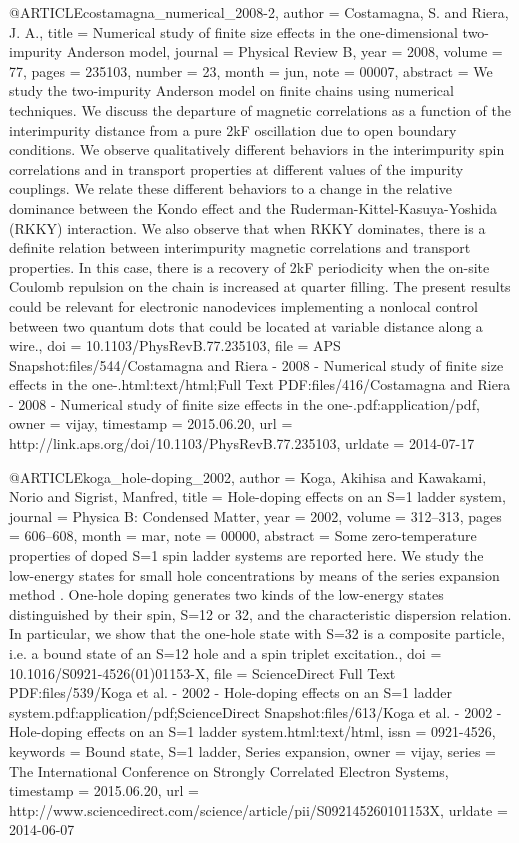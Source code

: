 @ARTICLE{costamagna_numerical_2008-2,
  author = {Costamagna, S. and Riera, J. A.},
  title = {Numerical study of finite size effects in the one-dimensional two-impurity
	{Anderson} model},
  journal = {Physical Review B},
  year = {2008},
  volume = {77},
  pages = {235103},
  number = {23},
  month = jun,
  note = {00007},
  abstract = {We study the two-impurity Anderson model on finite chains using numerical
	techniques. We discuss the departure of magnetic correlations as
	a function of the interimpurity distance from a pure 2kF oscillation
	due to open boundary conditions. We observe qualitatively different
	behaviors in the interimpurity spin correlations and in transport
	properties at different values of the impurity couplings. We relate
	these different behaviors to a change in the relative dominance between
	the Kondo effect and the Ruderman-Kittel-Kasuya-Yoshida (RKKY) interaction.
	We also observe that when RKKY dominates, there is a definite relation
	between interimpurity magnetic correlations and transport properties.
	In this case, there is a recovery of 2kF periodicity when the on-site
	Coulomb repulsion on the chain is increased at quarter filling. The
	present results could be relevant for electronic nanodevices implementing
	a nonlocal control between two quantum dots that could be located
	at variable distance along a wire.},
  doi = {10.1103/PhysRevB.77.235103},
  file = {APS Snapshot:files/544/Costamagna and Riera - 2008 - Numerical study of finite size effects in the one-.html:text/html;Full Text PDF:files/416/Costamagna and Riera - 2008 - Numerical study of finite size effects in the one-.pdf:application/pdf},
  owner = {vijay},
  timestamp = {2015.06.20},
  url = {http://link.aps.org/doi/10.1103/PhysRevB.77.235103},
  urldate = {2014-07-17}
}

@ARTICLE{koga_hole-doping_2002,
  author = {Koga, Akihisa and Kawakami, Norio and Sigrist, Manfred},
  title = {Hole-doping effects on an {S}=1 ladder system},
  journal = {Physica B: Condensed Matter},
  year = {2002},
  volume = {312--313},
  pages = {606--608},
  month = mar,
  note = {00000},
  abstract = {Some zero-temperature properties of doped S=1 spin ladder systems
	are reported here. We study the low-energy states for small hole
	concentrations by means of the series expansion method . One-hole
	doping generates two kinds of the low-energy states distinguished
	by their spin, S=12 or 32, and the characteristic dispersion relation.
	In particular, we show that the one-hole state with S=32 is a composite
	particle, i.e. a bound state of an S=12 hole and a spin triplet excitation.},
  doi = {10.1016/S0921-4526(01)01153-X},
  file = {ScienceDirect Full Text PDF:files/539/Koga et al. - 2002 - Hole-doping effects on an S=1 ladder system.pdf:application/pdf;ScienceDirect Snapshot:files/613/Koga et al. - 2002 - Hole-doping effects on an S=1 ladder system.html:text/html},
  issn = {0921-4526},
  keywords = {Bound state, S=1 ladder, Series expansion},
  owner = {vijay},
  series = {The {International} {Conference} on {Strongly} {Correlated} {Electron}
	{Systems}},
  timestamp = {2015.06.20},
  url = {http://www.sciencedirect.com/science/article/pii/S092145260101153X},
  urldate = {2014-06-07}
}


